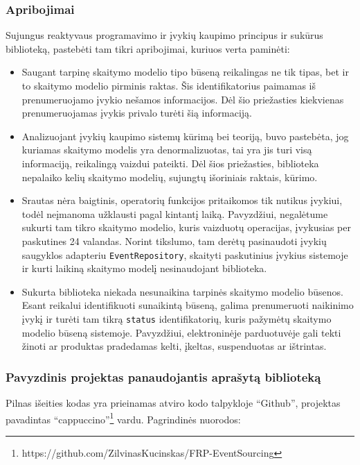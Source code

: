 \subsubsection{Apribojimai}

Sujungus reaktyvaus programavimo ir įvykių kaupimo principus ir sukūrus biblioteką, pastebėti tam tikri apribojimai, kuriuos verta paminėti:

\begin{itemize}
  \item Saugant tarpinę skaitymo modelio tipo būseną reikalingas ne tik tipas, bet ir to skaitymo modelio pirminis raktas. Šis identifikatorius paimamas iš prenumeruojamo įvykio nešamos informacijos. Dėl šio priežasties kiekvienas prenumeruojamas įvykis privalo turėti šią informaciją.
  \item Analizuojant įvykių kaupimo sistemų kūrimą bei teoriją, buvo pastebėta, jog kuriamas skaitymo modelis yra denormalizuotas, tai yra jis turi visą informaciją, reikalingą vaizdui pateikti. Dėl šios priežasties, biblioteka nepalaiko kelių skaitymo modelių, sujungtų išoriniais raktais, kūrimo.
  \item Srautas nėra baigtinis, operatorių funkcijos pritaikomos tik nutikus įvykiui, todėl neįmanoma užklausti pagal kintantį laiką. Pavyzdžiui, negalėtume sukurti tam tikro skaitymo modelio, kuris vaizduotų operacijas, įvykusias per paskutines 24 valandas. Norint tikslumo, tam derėtų pasinaudoti įvykių saugyklos adapteriu \lstinline|EventRepository|, skaityti paskutinius įvykius sistemoje ir kurti laikiną skaitymo modelį nesinaudojant biblioteka.
  \item Sukurta biblioteka niekada nesunaikina tarpinės skaitymo modelio būsenos. Esant reikalui identifikuoti sunaikintą būseną, galima prenumeruoti naikinimo įvykį ir turėti tam tikrą \lstinline|status| identifikatorių, kuris pažymėtų skaitymo modelio būseną sistemoje. Pavyzdžiui, elektroninėje parduotuvėje gali tekti žinoti ar produktas pradedamas kelti, įkeltas, suspenduotas ar ištrintas.
\end{itemize}

\subsubsection{Pavyzdinis projektas panaudojantis aprašytą biblioteką}

Pilnas išeities kodas yra prieinamas atviro kodo talpykloje ``Github'', projektas pavadintas ``cappuccino''\footnote{https://github.com/ZilvinasKucinskas/FRP-EventSourcing} vardu. Pagrindinės nuorodos:


